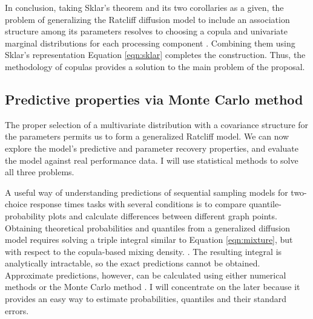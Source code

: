 \documentclass[12pt]{article}
\begin{document}
In conclusion, taking Sklar's theorem and
its two corollaries as a given, the problem of generalizing
the Ratcliff diffusion model to include an association
structure among its parameters resolves to choosing a copula
and univariate marginal distributions for each processing component
\citep{JohKot1994,JohKot1995}. Combining them using Sklar's
representation Equation \ref{eqn:sklar} completes the construction. Thus, the
methodology of copulas provides a solution to the main problem of the
proposal.


\subsection{Predictive properties via Monte Carlo method}

The proper selection of a multivariate
distribution with a covariance structure for the parameters permits us
to form a generalized Ratcliff model. We can now explore the model's predictive and
parameter recovery properties, and evaluate the model
against real performance data. I will use statistical methods to solve
all three problems.
	
A useful way of understanding predictions of sequential sampling models for two-choice response times tasks with several conditions is to compare quantile-probability plots and calculate differences between different graph points. Obtaining theoretical probabilities and quantiles from a generalized diffusion model requires solving a triple integral similar to Equation \ref{eqn:mixture}, but with respect to the copula-based mixing density. \citep{Tue2004}. The resulting integral is analytically intractable, so the exact predictions cannot be obtained.
Approximate predictions, however, can be calculated using either numerical methods \citep{GivHoe2012} or the Monte
Carlo method \citep{RobCas2004,GamLop2006}. I will concentrate on the later because it provides an easy way to estimate probabilities, quantiles and their standard errors. 
\end{document}
